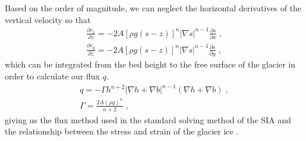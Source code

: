 \documentclass{article}
\begin{document}
Based on the order of magnitude, we can neglect the horizontal derivatives of the vertical velocity so that
\begin{subequations}
\begin{gather}
    \frac{\partial v_x}{\partial z} = -2A[\rho g (s-z)]^n|\nabla s |^{n-1}\frac{\partial s}{\partial x} \; ,\\
    \frac{\partial v_y}{\partial z} = -2A[\rho g (s-z)]^n|\nabla s |^{n-1}\frac{\partial s}{\partial y} \; ,
\end{gather}
\end{subequations}
which can be integrated from the bed height to the free surface of the glacier in order to calculate our flux $q$.
\begin{subequations}
\begin{gather}\label{q}
    q = -\Gamma  h^{n+2} |\nabla h+\nabla b|^{n-1} (\nabla h + \nabla b)  \; ,\\
    \Gamma = \frac{2A (\rho g)^n}{n+2} \; ,
\end{gather}
\end{subequations}
giving us the flux method used in the standard solving method of the SIA and the relationship between the stress and strain of the glacier ice \citep{Jarosch2013, Greve2009}.
\end{document}
